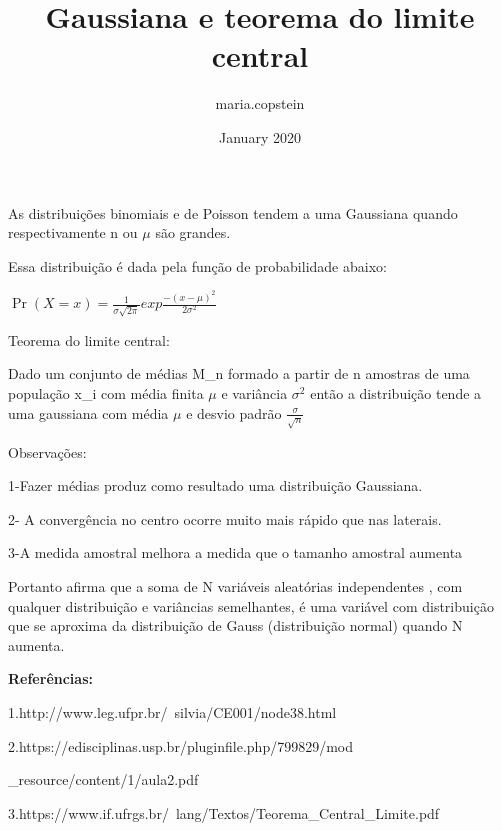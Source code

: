 \documentclass{article}
\title{Gaussiana e teorema do limite central}
\author{maria.copstein }
\date{January 2020}
\begin{document}
\maketitle
As distribuições binomiais e de Poisson tendem a uma Gaussiana quando respectivamente n ou ${\mu}$ são grandes.
\hfill

Essa distribuição é dada pela função de probabilidade abaixo:
\begin{center}
    $\Pr(X=x)=\frac{1}{\sigma \surd {2 \pi }}exp\frac{-(x-\mu)^2}{2\sigma^2 }$
    
\end{center}
Teorema do limite central:

\hfill 

Dado um conjunto de médias M\_{n} formado a partir de n amostras de uma população x\_{i} com média finita $\mu$ e variância $\sigma^2$ então a distribuição tende a uma gaussiana com média $\mu$ e desvio padrão $\frac{\sigma}{\surd{n} }$

\hfill

Observações:

\hfill 

1-Fazer médias produz como resultado uma distribuição Gaussiana.

\hfill 

2- A convergência no centro ocorre muito mais rápido que nas laterais.

\hfill 

3-A medida amostral melhora a medida que o tamanho amostral aumenta

\hfill 

Portanto afirma que a soma  de N variáveis aleatórias independentes , com qualquer distribuição e variâncias semelhantes, é uma variável com distribuição que se aproxima da distribuição de Gauss (distribuição normal) quando N aumenta.

\textbf{Referências:} \
   
\hfill

1.http://www.leg.ufpr.br/~silvia/CE001/node38.html

\hfill 

2.https://edisciplinas.usp.br/pluginfile.php/799829/mod
\hfill 

\_resource/content/1/aula2.pdf

\hfill 

3.https://www.if.ufrgs.br/~lang/Textos/Teorema\_Central\_Limite.pdf

    
\end{document}
